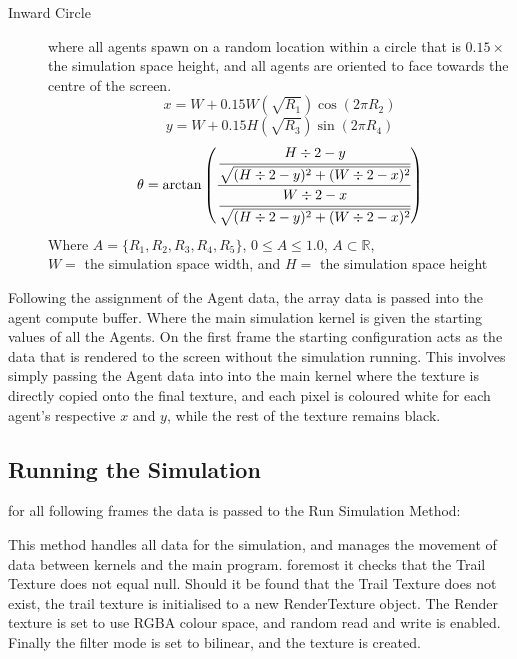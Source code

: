 \documentclass[]{report}
\begin{document}
\begin{description}
    \item[Inward Circle] where all agents spawn on a random location within a circle that is $0.15 \times$ the simulation space height, and all agents are oriented to face towards the centre of the screen.
     \begin{equation}
        x = W + 0.15W(\sqrt{R_{1}}) \cos{(2\pi R_{2})}
    \end{equation}
    \begin{equation}
        y = W + 0.15H(\sqrt{R_{3}}) \sin{(2\pi R_{4})}
    \end{equation}
    \begin{equation}
        \theta = \arctan\left(\cfrac{
        \cfrac{H\div 2 - y}{\sqrt{(H\div 2 - y)^{2} + (W\div 2 - x)^2}}}{
        \cfrac{W\div 2 - x}{\sqrt{(H\div 2 - y)^{2} + (W\div 2 - x)^2}}}
        \right)
    \end{equation}
    Where $A=\{R_{1},R_{2},R_{3},R_{4},R_{5}\}$,  
    $0 \leq A \leq 1.0$, $A \subset \mathbb{R}$, \\
    $W =$ the simulation space width, and $H =$ the simulation space height
\end{description}

Following the assignment of the Agent data, the array data is passed into the agent compute buffer. Where the main simulation \gls{kernel} is given the starting values of all the Agents. On the first frame the starting configuration acts as the data that is rendered to the screen without the simulation running. This involves simply passing the Agent data into into the main kernel where the texture is directly copied onto the final texture, and each pixel is coloured white for each agent's respective $x$ and $y$, while the rest of the texture remains black.

\subsection{Running the Simulation}

for all following frames the data is passed to the Run Simulation Method:

This method handles all data for the simulation, and manages the movement of data between kernels and the main program. foremost it checks that the Trail Texture does not equal null. Should it be found that the Trail Texture does not exist, the trail texture is initialised to a new RenderTexture object. The Render texture is set to use \Gls{RGBA} colour space, and random read and write is enabled. Finally the filter mode is set to \gls{bilinear}, and the texture is created.
\end{document}
